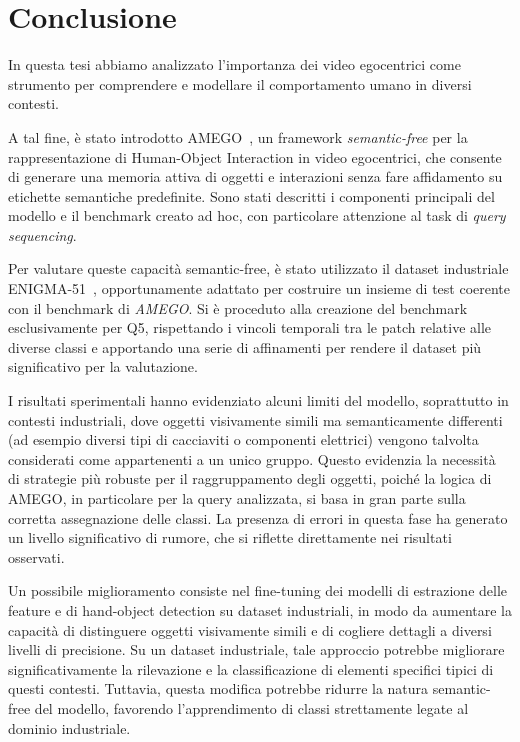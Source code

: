 \chapter*{Conclusione}

In questa tesi abbiamo analizzato l'importanza dei video egocentrici come strumento per comprendere e modellare il comportamento umano in diversi contesti.

A tal fine, è stato introdotto AMEGO~\cite{goletto2024amego}, un framework \emph{semantic-free} per la rappresentazione di Human-Object Interaction in video egocentrici, che consente di generare una memoria attiva di oggetti e interazioni senza fare affidamento su etichette semantiche predefinite. Sono stati descritti i componenti principali del modello e il benchmark creato ad hoc, con particolare attenzione al task di \emph{query sequencing}.

Per valutare queste capacità semantic-free, è stato utilizzato il dataset industriale ENIGMA-51~\cite{ragusa2023enigma51}, opportunamente adattato per costruire un insieme di test coerente con il benchmark di \emph{AMEGO}. Si è proceduto alla creazione del benchmark esclusivamente per Q5, rispettando i vincoli temporali tra le patch relative alle diverse classi e apportando una serie di affinamenti per rendere il dataset più significativo per la valutazione.

I risultati sperimentali hanno evidenziato alcuni limiti del modello, soprattutto in contesti industriali, 
dove oggetti visivamente simili ma semanticamente differenti (ad esempio diversi tipi di cacciaviti o componenti elettrici) 
vengono talvolta considerati come appartenenti a un unico gruppo. 
Questo evidenzia la necessità di strategie più robuste per il raggruppamento degli oggetti, 
poiché la logica di AMEGO, in particolare per la query analizzata, si basa in gran parte sulla corretta assegnazione delle classi. 
La presenza di errori in questa fase ha generato un livello significativo di rumore, 
che si riflette direttamente nei risultati osservati.

Un possibile miglioramento consiste nel fine-tuning dei modelli di estrazione delle feature e di hand-object detection su dataset industriali, in modo da aumentare la capacità di distinguere oggetti visivamente simili e di cogliere dettagli a diversi livelli di precisione. 
Su un dataset industriale, tale approccio potrebbe migliorare significativamente la rilevazione e la classificazione di elementi specifici tipici di questi contesti. Tuttavia, questa modifica potrebbe ridurre la natura semantic-free del modello, favorendo l'apprendimento di classi strettamente legate al dominio industriale.

